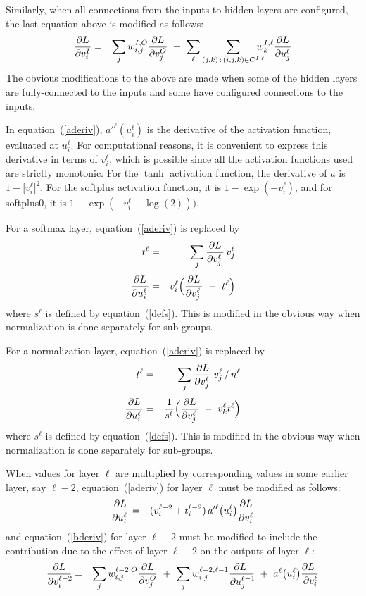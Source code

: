 \documentclass{report}[11pt]
\def\beq{\begin{eqnarray}}
\def\eeq{\end{eqnarray}}
\begin{document}
Similarly, when all connections from the inputs to hidden layers are
configured, the last equation above is modified as follows:\beq
  {\partial L \over \partial v^I_{i\ }\!} & = & 
    \sum_j w^{I,O}_{i,j} {\partial L \over \partial v^O_j}\ +\
    \sum_{\ell} 
         \sum_{(j,k)\,:\, (i,j,k)\in C^{I,\ell}}\!\!\!\!\!\!
             w^{I,\ell}_k {\partial L \over \partial u^{\ell}_j }
\eeq%
The obvious modifications to the above are made when some of the 
hidden layers are fully-connected to the inputs and some have
configured connections to the inputs.

In equation~(\ref{aderiv}), $a'^{\ell}(u^{\ell}_i)$ is the derivative of
the activation function, evaluated at $u^{\ell}_i$.  For computational
reasons, it is convenient to express this derivative in terms of
$v^{\ell}_i$, which is possible since all the activation functions
used are strictly monotonic.  For the $\tanh$ activation function, the
derivative of $a$ is $1 - \big[v^{\ell}_i\big]^2\!$.  For the softplus
activation function, it is $1 - \exp(-v^{\ell}_i)$, and for softplus0,
it is $1 - \exp(-v^{\ell}_i-\log(2)))$.

For a softmax layer, equation~(\ref{aderiv}) is replaced by
\beq
 t^{\ell} & = & 
   \sum_j {\partial L \over \partial v^{\ell}_{j\ }\!}\,v^{\ell}_j
   \\[3pt]
 {\partial L \over \partial u^{\ell}_{i\ }\!} & = & 
   v^{\ell}_i \Big( {\partial L \over \partial v^{\ell}_{j\ }\!}
     \ -\ t^{\ell} \Big)
\eeq 
where $s^{\ell}$ is defined by equation~(\ref{defs}).  This is modified 
in the obvious way when normalization is done separately for sub-groups.

For a normalization layer, equation~(\ref{aderiv}) is replaced by
\beq
 t^{\ell} & = & 
   \sum_j {\partial L \over \partial v^{\ell}_{j\ }\!}\,v^{\ell}_j\,/\,n^{\ell}
   \\[3pt]
 {\partial L \over \partial u^{\ell}_{i\ }\!} & = & 
   {1 \over s^{\ell}} \Big( {\partial L \over \partial v^{\ell}_{j\ }\!}
     \ -\ v^{\ell}_k t^{\ell} \Big)
\eeq 
where $s^{\ell}$ is defined by equation~(\ref{defs}).  This is modified 
in the obvious way when normalization is done separately for sub-groups.

When values for layer $\ell$ are multiplied by corresponding values in some 
earlier layer, say $\ell\!-\!2$, equation~(\ref{aderiv}) for layer $\ell$ 
must be modified as follows:
\beq
  {\partial L \over \partial u^{\ell}_{i\ }\!} & = & 
   (v^{\ell-2}_i+t^{\ell-2}_i)\,a'^{\ell}\big(u^{\ell}_i\big)
    {\partial L \over \partial v^{\ell}_i } 
\eeq
and equation~(\ref{bderiv}) for layer $\ell\!-\!2$ must be modified to
include the contribution due to the effect of layer $\ell\!-\!2$ on
the outputs of layer $\ell$:
\beq
{\partial L \over \partial v^{\ell-2}_{i\ }\!} & = &
  \sum_j w^{\ell-2,O}_{i,j} {\partial L \over \partial v^O_j} \ +\
  \sum_j w^{\ell-2,\ell-1}_{i,j} {\partial L\ \over \partial u^{\ell-1}_j\!}
   \ +\ a^{\ell}\big(u^{\ell}_i\big) {\partial L\ \over \partial v^{\ell}_i\!}
\eeq
\end{document}
